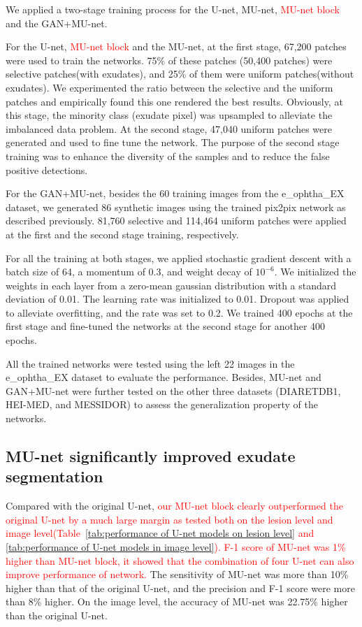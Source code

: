 \documentclass{osa-article}
\begin{document}
We applied a two-stage training process for the U-net, MU-net, \textcolor{red}{MU-net block} and the GAN+MU-net.  

For the U-net, \textcolor{red}{MU-net block} and the MU-net, at the first stage, 67,200 patches were used to train the networks. 75\% of these patches (50,400 patches) were selective patches(with exudates), and 25\% of them were uniform patches(without exudates). We experimented the ratio between the selective and the uniform patches and empirically found this one rendered the best results. Obviously, at this stage, the minority class (exudate pixel) was upsampled to alleviate the imbalanced data problem. At the second stage, 47,040 uniform patches were generated and used to fine tune the network. The purpose of the second stage training was to enhance the diversity of the samples and to reduce the false positive detections. 



For the GAN+MU-net, besides the 60 training images from the e\_ophtha\_EX dataset, we generated 86 synthetic
images using the trained pix2pix network as described previously. 81,760 selective and 114,464 uniform patches were applied at the first and the second stage training, respectively.

For all the training at both stages, we applied stochastic gradient descent with a batch size of 64, a momentum of 0.3, and weight decay of $10^{-6}$. We initialized the weights in each layer from a zero-mean gaussian distribution with a standard deviation of 0.01. The learning rate was initialized to 0.01. Dropout was applied to alleviate overfitting, and the rate was set to 0.2. We trained 400 epochs at the first stage and fine-tuned the networks at the second stage for another 400 epochs.

All the trained networks were tested using the left 22 images in the e\_ophtha\_EX  dataset to evaluate the performance. Besides, MU-net and GAN+MU-net were further tested on the other three datasets (DIARETDB1, HEI-MED, and MESSIDOR) to assess the generalization property of the networks.



\subsection{MU-net significantly improved exudate segmentation}

Compared with the original U-net, \textcolor{red}{our MU-net block clearly outperformed the original U-net by a much large margin as tested both on the lesion level and image level(Table~\ref{tab:performance of U-net models on lesion level} and \ref{tab:performance of U-net models in image level}). F-1 score of MU-net was 1\% higher than MU-net block, it showed that the combination of four U-net can also improve performance of network.}  The sensitivity of MU-net was more than 10\% higher than that of the original U-net, and the precision and F-1 score were more than 8\% higher. On the image level, the accuracy of MU-net was 22.75\% higher than the original U-net. 
\end{document}
